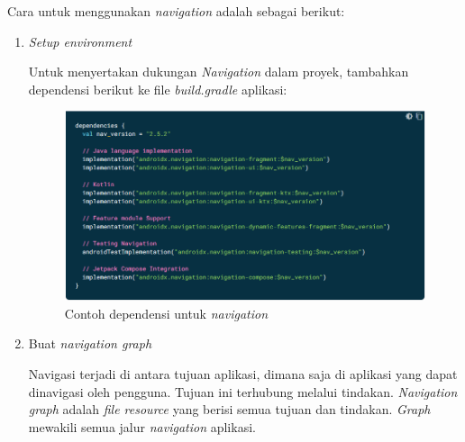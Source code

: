 Cara untuk menggunakan \textit{navigation} adalah sebagai berikut:
\begin{enumerate}
\item \textit{Setup environment}

Untuk menyertakan dukungan \textit{Navigation} dalam proyek, tambahkan dependensi berikut ke file \textit{build.gradle} aplikasi:
\begin{figure}[H]
	\centering
	\includegraphics[keepaspectratio, width=12cm]{gambar/navigation_setup}
	\caption{Contoh dependensi untuk \textit{navigation} \citep{developerandroid}}
	\label{gambar:gambar_37}
\end{figure}

\item Buat \emph{navigation graph}

Navigasi terjadi di antara tujuan aplikasi, dimana saja di aplikasi yang dapat dinavigasi oleh pengguna. Tujuan ini terhubung melalui tindakan. \textit{Navigation graph} adalah \textit{file resource} yang berisi semua tujuan dan tindakan. \textit{Graph} mewakili semua jalur \textit{navigation} aplikasi.


\end{enumerate}
